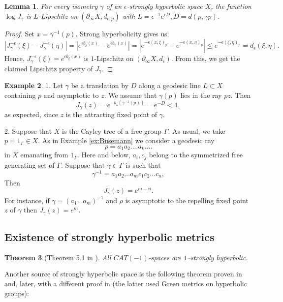 \documentclass[12pt]{amsbook}%
\newtheorem{thm}{Theorem}[chapter]
\newtheorem{lem}[thm]{Lemma}
\theoremstyle{definition}
\newtheorem{example}[thm]{Example}
\theoremstyle{remark}
\numberwithin{section}{chapter}
\numberwithin{subsection}{section}
\numberwithin{figure}{chapter}
\def\eps{\epsilon}
\def\Ga{\Gamma}
\def\ga{\gamma}
\def\geo{\partial_\infty}
\begin{document}
\begin{lem}\label{lem:Lip Jacobian}
For every isometry $\ga$ of an $\eps$-strongly hyperbolic space $X$, the function $\log J_\ga$ is $L$-Lipschitz on $(\geo X, d_{\eps,p})$ with $L=\eps^{-1}e^{\eps D}, D=d(p,\ga p)$. 
\end{lem}
\begin{proof} Set $x=\ga^{-1}(p)$. Strong hyperbolicity gives us: 
$$
|J^{-\eps}_\ga(\xi)-J^{-\eps}_\ga(\eta)|=|e^{\eps b_\xi(x)} - e^{\eps b_\eta(x)}|= |e^{-\eps(x,\xi)_p} - e^{-\eps(x,\eta)_p}|\leqslant e^{-\eps (\xi,\eta)_p}=d_\eps(\xi,\eta). 
$$
Hence, $J^{-\eps}_\ga(\xi)= e^{\eps b_\xi(x)}$ is $1$-Lipschitz on $(\geo X,d_\eps)$. From this, we get the claimed Lipschitz property of $J_\ga$. 
\end{proof}



\begin{example}\label{ex:free-jacobian}
1. Let $\ga$ be a translation by $D$ along a geodesic line $L\subset X$ containing $p$ and asymptotic to $z$. We assume that $\ga(p)$ lies in the ray $pz$. Then
$$
J_\ga(z)= e^{-b_z(\ga^{-1}(p))}= e^{-D}<1, 
$$
as expected, since $z$ is the attracting fixed point of $\ga$. 

2. Suppose that $X$ is the Cayley tree of a free group $\Ga$. As usual, we take $p=1_\Ga\in X$. 
As in Example \ref{ex:Busemann} we consider a geodesic ray 
$$
\rho=a_1a_2....a_k....
$$
in $X$ emanating from $1_\Ga$. Here and below, $a_i, c_j$ belong to the symmetrized free generating set of $\Ga$. 
Suppose that $\ga\in\Ga$ is such that
$$
\ga^{-1}=a_1a_2...a_mc_1c_2...c_n,
$$
Then 
$$
J_\ga(z)= e^{m-n}. 
$$
For instance, if $\ga=(a_1...a_m)^{-1}$ and $\rho$ is asymptotic to the repelling fixed point $z$ of $\ga$ then $J_\ga(z)= e^{m}$. 
\end{example}


\subsection{Existence of strongly hyperbolic metrics} 
\label{sec:green_metric}

\begin{thm}
[Theorem 5.1 in \cite{Nica-Spakula}] All $CAT(-1)$-spaces are $1$--strongly hyperbolic.
\end{thm}
 
Another source of strongly hyperbolic space is   the following theorem proven in \cite[Theorem 5]{Mineyev} and, later, 
with a different proof in \cite[Theorem 6.1]{Nica-Spakula} (the latter used Green metrics on hyperbolic groups): 
\end{document}
